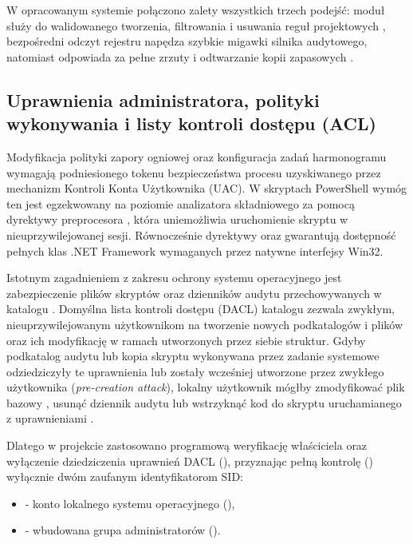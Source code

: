 W opracowanym systemie połączono zalety wszystkich trzech podejść: moduł  służy do walidowanego tworzenia, filtrowania i usuwania reguł projektowych , bezpośredni odczyt rejestru napędza szybkie migawki silnika audytowego, natomiast  odpowiada za pełne zrzuty i odtwarzanie kopii zapasowych .

\subsection{Uprawnienia administratora, polityki wykonywania i listy kontroli dostępu (ACL)}\label{subsec:uprawnienia-executionpolicy}

Modyfikacja polityki zapory ogniowej oraz konfiguracja zadań harmonogramu wymagają podniesionego tokenu bezpieczeństwa procesu uzyskiwanego przez mechanizm Kontroli Konta Użytkownika (UAC). W skryptach PowerShell wymóg ten jest egzekwowany na poziomie analizatora składniowego za pomocą dyrektywy preprocesora , która uniemożliwia uruchomienie skryptu w nieuprzywilejowanej sesji. Równocześnie dyrektywy  oraz  gwarantują dostępność pełnych klas .NET Framework wymaganych przez natywne interfejsy Win32.

Istotnym zagadnieniem z zakresu ochrony systemu operacyjnego jest zabezpieczenie plików skryptów oraz dzienników audytu przechowywanych w katalogu . Domyślna lista kontroli dostępu (DACL) katalogu  zezwala zwykłym, nieuprzywilejowanym użytkownikom na tworzenie nowych podkatalogów i plików oraz ich modyfikację w ramach utworzonych przez siebie struktur. Gdyby podkatalog audytu lub kopia skryptu wykonywana przez zadanie systemowe odziedziczyły te uprawnienia lub zostały wcześniej utworzone przez zwykłego użytkownika (\textit{pre-creation attack}), lokalny użytkownik mógłby zmodyfikować plik bazowy , usunąć dziennik audytu lub wstrzyknąć kod do skryptu uruchamianego z uprawnieniami .

Dlatego w projekcie zastosowano programową weryfikację właściciela oraz wyłączenie dziedziczenia uprawnień DACL (), przyznając pełną kontrolę () wyłącznie dwóm zaufanym identyfikatorom SID:
\begin{itemize}
    \item {} - konto lokalnego systemu operacyjnego (),
    \item {} - wbudowana grupa administratorów ().
\end{itemize}

